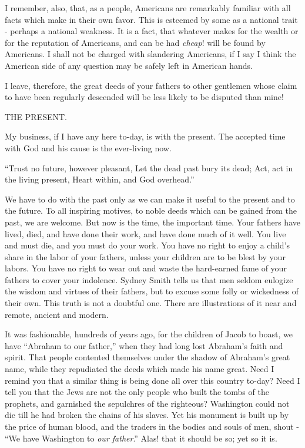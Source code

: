 I remember, also, that, as a people, Americans are remarkably familiar with all facts which make in their own favor. This is esteemed by some as a national trait - perhaps a national weakness. It is a fact, that whatever makes for the wealth or for the reputation of Americans, and can be had \textit{cheap}! will be found by Americans. I shall not be charged with slandering Americans, if I say I think the American side of any question may be safely left in American hands.\par

I leave, therefore, the great deeds of your fathers to other gentlemen whose claim to have been regularly descended will be less likely to be disputed than mine!\par

THE PRESENT.\par

My business, if I have any here to-day, is with the present. The accepted time with God and his cause is the ever-living now.\par

“Trust no future, however pleasant, Let the dead past bury its dead; Act, act in the living present, Heart within, and God overhead.”\par

We have to do with the past only as we can make it useful to the present and to the future. To all inspiring motives, to noble deeds which can be gained from the past, we are welcome. But now is the time, the important time. Your fathers have lived, died, and have done their work, and have done much of it well. You live and must die, and you must do your work. You have no right to enjoy a child’s share in the labor of your fathers, unless your children are to be blest by your labors. You have no right to wear out and waste the hard-earned fame of your fathers to cover your indolence. Sydney Smith tells us that men seldom eulogize the wisdom and virtues of their fathers, but to excuse some folly or wickedness of their own. This truth is not a doubtful one. There are illustrations of it near and remote, ancient and modern.\par

It was fashionable, hundreds of years ago, for the children of Jacob to boast, we have “Abraham to our father,” when they had long lost Abraham’s faith and spirit. That people contented themselves under the shadow of Abraham’s great name, while they repudiated the deeds which made his name great. Need I remind you that a similar thing is being done all over this country to-day? Need I tell you that the Jews are not the only people who built the tombs of the prophets, and garnished the sepulchres of the righteous? Washington could not die till he had broken the chains of his slaves. Yet his monument is built up by the price of human blood, and the traders in the bodies and souls of men, shout - “We have Washington to \textit{our father}.” Alas! that it should be so; yet so it is.\par

